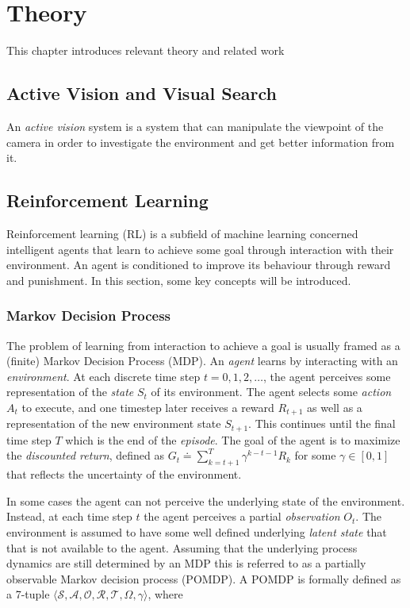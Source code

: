 \chapter{Theory}
\label{cha:theory}

This chapter introduces relevant theory and related work 

\section{Active Vision and Visual Search}

An \textit{active vision} system is a system that can manipulate the viewpoint of the camera in order to investigate the environment and get better information from it.



\section{Reinforcement Learning}

Reinforcement learning (RL) is a subfield of machine learning concerned intelligent agents that learn to achieve some goal through interaction with their environment. An agent is conditioned to improve its behaviour through reward and punishment. In this section, some key concepts will be introduced.

\subsection{Markov Decision Process}

The problem of learning from interaction to achieve a goal is usually framed as a (finite) Markov Decision Process (MDP). An \textit{agent} learns by interacting with an \textit{environment}. At each discrete time step \(t = 0, 1, 2, \dots\), the agent perceives some representation of the \textit{state} \(S_t\) of its environment. The agent selects some \textit{action} \(A_t\) to execute, and one timestep later receives a reward \(R_{t+1}\) as well as a representation of the new environment state \(S_{t+1}\). This continues until the final time step \(T\) which is the end of the \textit{episode}. The goal of the agent is to maximize the \textit{discounted return}, defined as \(G_t \doteq \sum_{k=t+1}^T \gamma^{k-t-1} R_{k}\) for some \(\gamma \in [0, 1]\) that reflects the uncertainty of the environment.   

In some cases the agent can not perceive the underlying state of the environment. Instead, at each time step \(t\) the agent perceives a partial \textit{observation} \(O_t\). The environment is assumed to have some well defined underlying \textit{latent state} that that is not available to the agent. Assuming that the underlying process dynamics are still determined by an MDP this is referred to as a partially observable Markov decision process (POMDP). A POMDP is formally defined as a 7-tuple \(\langle \mathcal{S}, \mathcal{A}, \mathcal{O}, \mathcal{R}, \mathcal{T}, \Omega, \gamma \rangle\), where

